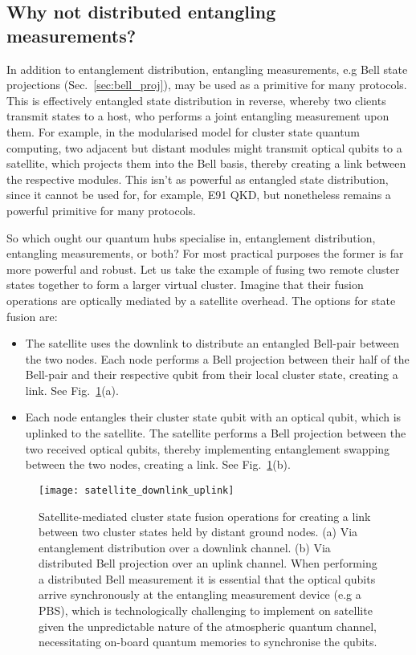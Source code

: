 
%
%

\subsection{Why not distributed entangling measurements?}

In addition to entanglement distribution, entangling measurements, e.g Bell state projections (Sec.~\ref{sec:bell_proj}), may be used as a primitive for many protocols. This is effectively entangled state distribution in reverse, whereby two clients transmit states to a host, who performs a joint entangling measurement upon them. For example, in the modularised model for cluster state quantum computing, two adjacent but distant modules might transmit optical qubits to a satellite, which projects them into the Bell basis, thereby creating a link between the respective modules. This isn't as powerful as entangled state distribution, since it cannot be used for, for example, E91 QKD, but nonetheless remains a powerful primitive for many protocols.

So which ought our quantum hubs specialise in, entanglement distribution, entangling measurements, or both? For most practical purposes the former is far more powerful and robust. Let us take the example of fusing two remote cluster states together to form a larger virtual cluster. Imagine that their fusion operations are optically mediated by a satellite overhead. The options for state fusion are:
\begin{itemize}
	\item The satellite uses the downlink to distribute an entangled Bell-pair between the two nodes. Each node performs a Bell projection between their half of the Bell-pair and their respective qubit from their local cluster state, creating a link. See Fig.~\ref{fig:sat_up_down}(a).
	\item Each node entangles their cluster state qubit with an optical qubit, which is uplinked to the satellite. The satellite performs a Bell projection between the two received optical qubits, thereby implementing entanglement swapping between the two nodes, creating a link. See Fig.~\ref{fig:sat_up_down}(b).
\end{itemize}

\begin{figure}[!htb]
	\texttt{[image: satellite\_downlink\_uplink]}
	\caption{Satellite-mediated cluster state fusion operations for creating a link between two cluster states held by distant ground nodes. (a) Via entanglement distribution over a downlink channel. (b) Via distributed Bell projection over an uplink channel. When performing a distributed Bell measurement it is essential that the optical qubits arrive synchronously at the entangling measurement device (e.g a PBS), which is technologically challenging to implement on satellite given the unpredictable nature of the atmospheric quantum channel, necessitating on-board quantum memories to synchronise the qubits.} \label{fig:sat_up_down}
\end{figure}

